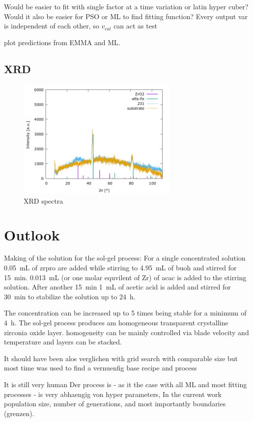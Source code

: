 \documentclass[a4paper]{article}
\newcommand{\picwidth}{0.7\textwidth}
\newcommand{\ml}[1]{\SI{#1}{\milli\liter}}
\newcommand{\minutes}[1]{\SI{#1}{\minute}}
\newcommand{\h}[1]{\SI{#1}{\hour}}
\begin{document}
Would be easier to fit with single factor at a time variation or latin hyper cuber?
Would it also be easier for PSO or ML to find fitting function?
Every output var is independent of each other, so $v_{cal}$ can act as test 

plot predictions from EMMA and ML.

\subsection{XRD}

\begin{figure}
	\centering
	\includegraphics[width=\picwidth]{Pics/xrd.png}
	\caption{XRD spectra}
	\label{fig:xrd}
\end{figure}
\section{Outlook}

Making of the solution for the sol-gel process:
For a single concentrated solution \ml{0.05} of \gls{zrpro} are added while stirring to \ml{4.95} of \gls{buoh} and stirred for \minutes{15}. 
\ml{0.013} (or one molar equvilent of Zr) of \gls{acac} is added to the stirring solution. 
After another \minutes{15} \ml{1} of acetic acid is added and stirred for \minutes{30} to stabilize the solution up to \h{24}. 

The concentration can be increased up to 5 times being stable for a minimum of \h{4}. 
The sol-gel process produces am homogeneous transparent crystalline zirconia oxide layer. 
homogeneity can be mainly controlled via blade velocity and temperature and layers can be stacked.

It should have been alos verglichen with grid search with comparable size
but most time was used to find a vernuenfig base recipe and process

It is still very human 
Der process is - as it the case with all ML and most fitting processes - is very abhaengig von hyper parameters, 
In the current work population size, number of generations, and most importantly boundaries (grenzen). 




\end{document}
